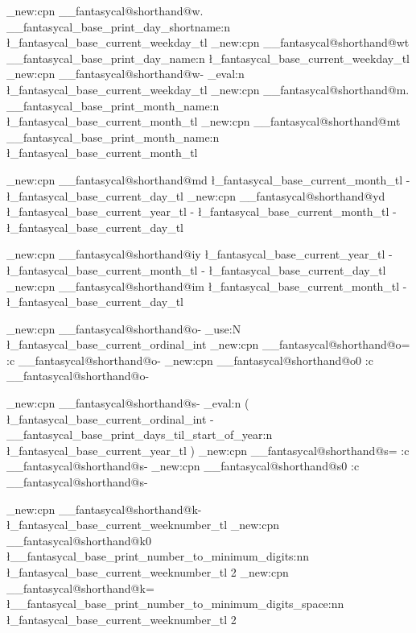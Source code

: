 \cs_new:cpn { __fantasycal@shorthand@w.}  
  { 
    \__fantasycal_base_print_day_shortname:n { \l_fantasycal_base_current_weekday_tl } 
  }
\cs_new:cpn { __fantasycal@shorthand@wt } 
  { 
    \__fantasycal_base_print_day_name:n { \l_fantasycal_base_current_weekday_tl } 
  }
\cs_new:cpn { __fantasycal@shorthand@w- } 
  { 
    \int_eval:n \l_fantasycal_base_current_weekday_tl
  }
\cs_new:cpn { __fantasycal@shorthand@m.}
  {
    \__fantasycal_base_print_month_name:n { \l_fantasycal_base_current_month_tl }
  }
\cs_new:cpn { __fantasycal@shorthand@mt }
  {
    \__fantasycal_base_print_month_name:n { \l_fantasycal_base_current_month_tl }
  }


%

\cs_new:cpn { __fantasycal@shorthand@md }
  {
    \l_fantasycal_base_current_month_tl - \l_fantasycal_base_current_day_tl
  }
\cs_new:cpn { __fantasycal@shorthand@yd }
  {
    \l_fantasycal_base_current_year_tl -
    \l_fantasycal_base_current_month_tl - \l_fantasycal_base_current_day_tl
  }

\cs_new:cpn { __fantasycal@shorthand@iy }
  {
    \l_fantasycal_base_current_year_tl -
    \l_fantasycal_base_current_month_tl - \l_fantasycal_base_current_day_tl
  }
\cs_new:cpn { __fantasycal@shorthand@im }
  {
    \l_fantasycal_base_current_month_tl - \l_fantasycal_base_current_day_tl
  }

\cs_new:cpn { __fantasycal@shorthand@o- } 
  { \int_use:N \l_fantasycal_base_current_ordinal_int }
\cs_new:cpn { __fantasycal@shorthand@o= } { \use:c { __fantasycal@shorthand@o- } }
\cs_new:cpn { __fantasycal@shorthand@o0 } { \use:c { __fantasycal@shorthand@o- } }

\cs_new:cpn { __fantasycal@shorthand@s- }
  {
    \int_eval:n 
      {(
        \l_fantasycal_base_current_ordinal_int
        - \__fantasycal_base_print_days_til_start_of_year:n { \l_fantasycal_base_current_year_tl }
      )}
  }
\cs_new:cpn { __fantasycal@shorthand@s= } { \use:c { __fantasycal@shorthand@s- } }
\cs_new:cpn { __fantasycal@shorthand@s0 } { \use:c { __fantasycal@shorthand@s- } }

\cs_new:cpn { __fantasycal@shorthand@k- } 
  { 
    \l_fantasycal_base_current_weeknumber_tl
  }
\cs_new:cpn { __fantasycal@shorthand@k0 } 
  { 
    \l__fantasycal_base_print_number_to_minimum_digits:nn 
      { \l_fantasycal_base_current_weeknumber_tl }
      { 2 }
  }
\cs_new:cpn { __fantasycal@shorthand@k= } 
  { 
    \l__fantasycal_base_print_number_to_minimum_digits_space:nn 
      { \l_fantasycal_base_current_weeknumber_tl }
      { 2 }
  }


